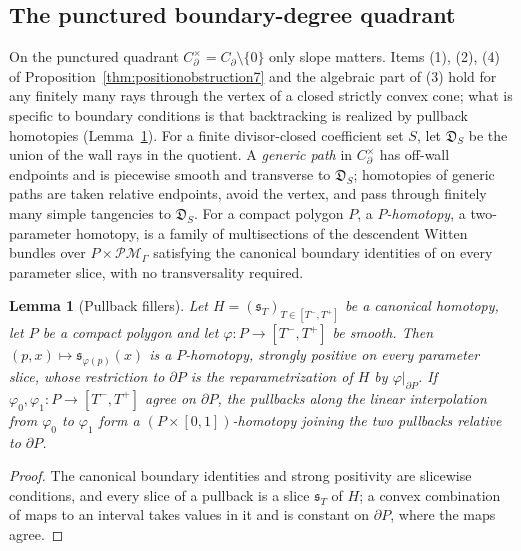 \documentclass[11pt]{amsart}
\newtheorem{lemma}[theorem]{Lemma}
\theoremstyle{definition}
\theoremstyle{remark}
\newcommand{\Dscr}{\mathfrak{D}}
\begin{document}
\subsection{The punctured boundary-degree quadrant}
\label{ssec:missing}

On the punctured quadrant $C_\partial^\times=C_\partial\setminus\{0\}$ only
slope matters.  Items (1), (2), (4) of
Proposition~\ref{thm:positionobstruction7} and the algebraic part of (3) hold
for any finitely many rays through the vertex of a closed strictly convex
cone; what is specific to boundary conditions is that backtracking is realized
by pullback homotopies (Lemma~\ref{lem:polytopeextension}).  For a finite
divisor-closed coefficient set $S$, let $\Dscr_S$ be the union of the wall rays
in the quotient.  A \emph{generic path} in $C_\partial^\times$ has off-wall endpoints and is piecewise smooth and transverse to $\Dscr_S$;
homotopies of generic paths are taken relative endpoints, avoid the vertex,
and pass through finitely many simple tangencies to $\Dscr_S$.  For a compact
polygon $P$, a \emph{$P$-homotopy}, a two-parameter homotopy, is a family of multisections of the
descendent Witten bundles over $P\times\mathcal{PM}_\Gamma$ satisfying the
canonical boundary identities of \cite[Def.~3.22]{GKT} on every parameter
slice, with no transversality required.

\begin{lemma}[Pullback fillers]
\label{lem:polytopeextension}
Let $H=(\mathfrak s_T)_{T\in[T^-,T^+]}$ be a canonical homotopy, let $P$ be a
compact polygon and let $\varphi:P\to[T^-,T^+]$ be smooth.  Then
$(p,x)\mapsto\mathfrak s_{\varphi(p)}(x)$ is a $P$-homotopy, strongly positive
on every parameter slice, whose restriction to $\partial P$ is the
reparametrization of $H$ by $\varphi|_{\partial P}$.  If
$\varphi_0,\varphi_1:P\to[T^-,T^+]$ agree on $\partial P$, the pullbacks along
the linear interpolation from $\varphi_0$ to $\varphi_1$ form a
$(P\times[0,1])$-homotopy joining the two pullbacks relative to $\partial P$.
\end{lemma}

\begin{proof}
The canonical boundary identities and strong positivity are slicewise
conditions, and every slice of a pullback is a slice $\mathfrak s_T$ of $H$; a convex combination of maps to an interval takes
values in it and is constant on $\partial P$, where the maps agree.
\end{proof}
\end{document}
